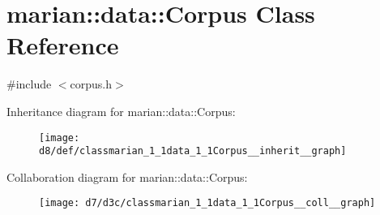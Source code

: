 \hypertarget{classmarian_1_1data_1_1Corpus}{}\section{marian\+:\+:data\+:\+:Corpus Class Reference}
\label{classmarian_1_1data_1_1Corpus}


{\ttfamily \#include $<$corpus.\+h$>$}



Inheritance diagram for marian\+:\+:data\+:\+:Corpus\+:
\nopagebreak
\begin{figure}[H]
\begin{center}
\leavevmode
\texttt{[image: d8/def/classmarian\_1\_1data\_1\_1Corpus\_\_inherit\_\_graph]}
\end{center}
\end{figure}


Collaboration diagram for marian\+:\+:data\+:\+:Corpus\+:
\nopagebreak
\begin{figure}[H]
\begin{center}
\leavevmode
\texttt{[image: d7/d3c/classmarian\_1\_1data\_1\_1Corpus\_\_coll\_\_graph]}
\end{center}
\end{figure}
